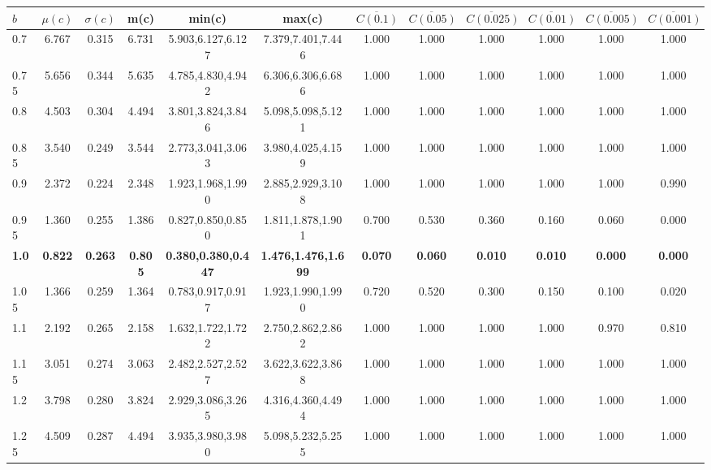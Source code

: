 \begin{table*}[h!]
\begin{center}
\begin{tabular}{| l | c | c | c | c | c | c | c | c | c | c | c |}\hline
$b$ & $\mu(c)$ & $\sigma(c)$ & m(c) & min(c) & max(c) & $\overline{C(0.1)}$ & $\overline{C(0.05)}$ & $\overline{C(0.025)}$ & $\overline{C(0.01)}$ & $\overline{C(0.005)}$ & $\overline{C(0.001)}$ \\\hline\hline
0.7 & 6.767 & 0.315 & 6.731 & 5.903,6.127,6.127 & 7.379,7.401,7.446  & 1.000  & 1.000  & 1.000  & 1.000  & 1.000  & 1.000 \\\hline
0.75 & 5.656 & 0.344 & 5.635 & 4.785,4.830,4.942 & 6.306,6.306,6.686  & 1.000  & 1.000  & 1.000  & 1.000  & 1.000  & 1.000 \\\hline
0.8 & 4.503 & 0.304 & 4.494 & 3.801,3.824,3.846 & 5.098,5.098,5.121  & 1.000  & 1.000  & 1.000  & 1.000  & 1.000  & 1.000 \\\hline
0.85 & 3.540 & 0.249 & 3.544 & 2.773,3.041,3.063 & 3.980,4.025,4.159  & 1.000  & 1.000  & 1.000  & 1.000  & 1.000  & 1.000 \\\hline
0.9 & 2.372 & 0.224 & 2.348 & 1.923,1.968,1.990 & 2.885,2.929,3.108  & 1.000  & 1.000  & 1.000  & 1.000  & 1.000  & 0.990 \\\hline
0.95 & 1.360 & 0.255 & 1.386 & 0.827,0.850,0.850 & 1.811,1.878,1.901  & 0.700  & 0.530  & 0.360  & 0.160  & 0.060  & 0.000 \\\hline
{\bf 1.0} & {\bf 0.822} & {\bf 0.263} & {\bf 0.805} & {\bf 0.380,0.380,0.447} & {\bf 1.476,1.476,1.699} & {\bf 0.070} & {\bf 0.060} & {\bf 0.010} & {\bf 0.010} & {\bf 0.000} & {\bf 0.000} \\\hline
1.05 & 1.366 & 0.259 & 1.364 & 0.783,0.917,0.917 & 1.923,1.990,1.990  & 0.720  & 0.520  & 0.300  & 0.150  & 0.100  & 0.020 \\\hline
1.1 & 2.192 & 0.265 & 2.158 & 1.632,1.722,1.722 & 2.750,2.862,2.862  & 1.000  & 1.000  & 1.000  & 1.000  & 0.970  & 0.810 \\\hline
1.15 & 3.051 & 0.274 & 3.063 & 2.482,2.527,2.527 & 3.622,3.622,3.868  & 1.000  & 1.000  & 1.000  & 1.000  & 1.000  & 1.000 \\\hline
1.2 & 3.798 & 0.280 & 3.824 & 2.929,3.086,3.265 & 4.316,4.360,4.494  & 1.000  & 1.000  & 1.000  & 1.000  & 1.000  & 1.000 \\\hline
1.25 & 4.509 & 0.287 & 4.494 & 3.935,3.980,3.980 & 5.098,5.232,5.255  & 1.000  & 1.000  & 1.000  & 1.000  & 1.000  & 1.000 \\\hline

\end{tabular}
\end{center}
\end{table*}
